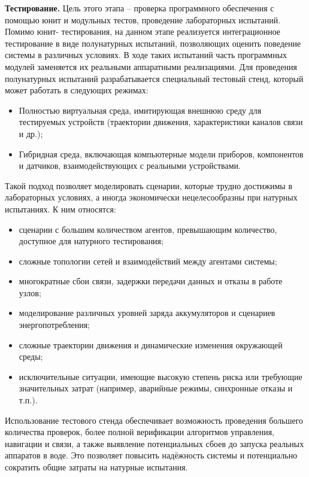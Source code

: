 \documentclass[
    numbers=section,
    document-code={ВКРБ--09.03.04--10.19--XX--26--81}
]{../latex/fqw}
\providecommand{\hl}[1]{#1}
\begin{document}
    \textbf{Тестирование.}
    Цель этого этапа -- проверка программного обеспечения с помощью юнит и модульных тестов,
    проведение лабораторных испытаний.
    Помимо юнит- тестирования, на данном этапе реализуется интеграционное тестирование в виде полунатурных испытаний,
    позволяющих оценить поведение системы в различных условиях.
    В ходе таких испытаний часть программных модулей заменяется их реальными аппаратными реализациями.
    Для проведения полунатурных испытаний разрабатывается специальный тестовый стенд,
    который может работать в следующих режимах:

    \begin{itemize}
        \item
        Полностью виртуальная среда, имитирующая внешнюю среду для тестируемых устройств
        (траектории движения, характеристики каналов связи и др.);
        \item
        Гибридная среда, включающая компьютерные модели приборов, компонентов и датчиков,
        взаимодействующих с реальными устройствами.
    \end{itemize}

    Такой подход позволяет моделировать сценарии, которые трудно достижимы в лабораторных условиях,
    а иногда экономически нецелесообразны при натурных испытаниях.
    К ним относятся:
    \begin{itemize}
        \item сценарии с большим количеством агентов, превышающим количество, доступное для натурного тестирования;
        \item сложные топологии сетей и взаимодействий между агентами системы;
        \item многократные сбои связи, задержки передачи данных и отказы в работе узлов;
        \item моделирование различных уровней заряда аккумуляторов и сценариев энергопотребления;
        \item сложные траектории движения и динамические изменения окружающей среды;
        \item
        исключительные ситуации, имеющие высокую степень риска или требующие значительных затрат
        (например, аварийные режимы, синхронные отказы и т.п.).
    \end{itemize}
    Использование тестового стенда обеспечивает возможность проведения большего количества проверок,
    более полной верификации алгоритмов управления, навигации и связи,
    а также выявление потенциальных сбоев до запуска реальных аппаратов в воде.
    Это позволяет повысить надёжность системы и \hl{потенциально} сократить общие затраты на натурные испытания.
\end{document}
